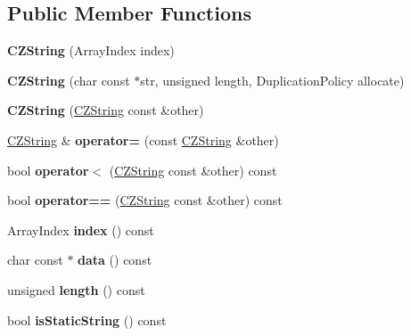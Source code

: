 \subsection*{Public Member Functions}
\begin{DoxyCompactItemize}
\item 
\mbox{\label{classJson_1_1Value_1_1CZString_a4b8aa6eaabdec78cffec96e088da996f}} 
{\bfseries C\+Z\+String} (Array\+Index index)
\item 
\mbox{\label{classJson_1_1Value_1_1CZString_a86a86eaf0cf26d4c861d0daa359d608a}} 
{\bfseries C\+Z\+String} (char const $\ast$str, unsigned length, Duplication\+Policy allocate)
\item 
\mbox{\label{classJson_1_1Value_1_1CZString_a9685070d440335b55ef5c85747d25157}} 
{\bfseries C\+Z\+String} (\hyperlink{classJson_1_1Value_1_1CZString}{C\+Z\+String} const \&other)
\item 
\mbox{\label{classJson_1_1Value_1_1CZString_aba1b28d22cdd1eaad1c17f8844af9d4a}} 
\hyperlink{classJson_1_1Value_1_1CZString}{C\+Z\+String} \& {\bfseries operator=} (const \hyperlink{classJson_1_1Value_1_1CZString}{C\+Z\+String} \&other)
\item 
\mbox{\label{classJson_1_1Value_1_1CZString_ae023bb91b4b4520c82d5e6e4da8c310a}} 
bool {\bfseries operator$<$} (\hyperlink{classJson_1_1Value_1_1CZString}{C\+Z\+String} const \&other) const
\item 
\mbox{\label{classJson_1_1Value_1_1CZString_ad41766c98fc6a6d5fcd72aaf78fc5db0}} 
bool {\bfseries operator==} (\hyperlink{classJson_1_1Value_1_1CZString}{C\+Z\+String} const \&other) const
\item 
\mbox{\label{classJson_1_1Value_1_1CZString_a0f3ba09401525d4f01dafd577122ee32}} 
Array\+Index {\bfseries index} () const
\item 
\mbox{\label{classJson_1_1Value_1_1CZString_af6eee54f8dc43a1203d5af6ba0a5c9a2}} 
char const  $\ast$ {\bfseries data} () const
\item 
\mbox{\label{classJson_1_1Value_1_1CZString_aa7ee665d162c1f33b3ec818e289d8a5e}} 
unsigned {\bfseries length} () const
\item 
\mbox{\label{classJson_1_1Value_1_1CZString_a5991dfa2f6c2ba318373c7429fcd7a57}} 
bool {\bfseries is\+Static\+String} () const
\end{DoxyCompactItemize}

